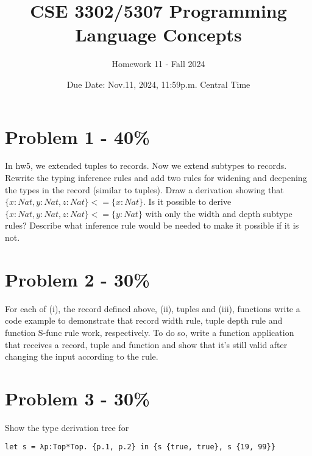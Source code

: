 \documentclass{article}
\newcommand{\answerboxbig}{
    \vspace{20cm} %
}
\begin{document}
\title{CSE 3302/5307 Programming Language Concepts}
\author{Homework 11 - Fall 2024}
\date{Due Date: Nov.11, 2024, 11:59p.m. Central Time}
\maketitle
\thispagestyle{fancy}


\section*{Problem 1 - 40\%}

In hw5, we extended tuples to records. Now we extend subtypes to records. Rewrite the typing inference rules and add two rules for widening and deepening the types in the record (similar to tuples). Draw a derivation showing that $\{x:Nat, y:Nat, z:Nat\} <= \{x:Nat\}$. Is it possible to derive $\{x:Nat, y:Nat, z:Nat\} <= \{y:Nat\}$ with only the width and depth subtype rules? Describe what inference rule would be needed to make it possible if it is not.

\answerboxbig


\section*{Problem 2 - 30\%}

For each of (i), the record defined above, (ii), tuples and (iii), functions write a code example to demonstrate that record width rule, tuple depth rule and function S-func rule work, respectively. To do so, write a function application that receives a record, tuple and function and show that it's still valid after changing the input according to the rule.

\answerboxbig


\section*{Problem 3 - 30\%}

Show the type derivation tree for

\begin{lstlisting}
let s = λp:Top*Top. {p.1, p.2} in {s {true, true}, s {19, 99}}

\end{lstlisting}



\end{document}
